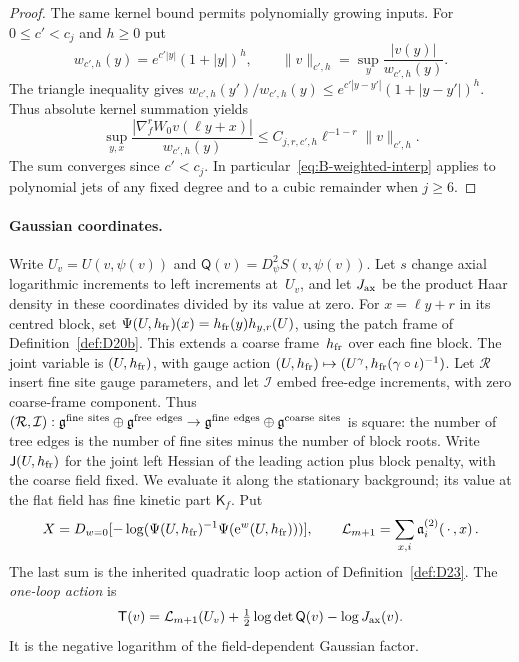 \begin{proof}
The same kernel bound permits polynomially growing inputs. For $0\le c'<c_j$ and $h\ge0$ put
\begin{equation*}
w_{c',h}(y)=e^{c'|y|}(1+|y|)^h,\qquad
\|v\|_{c',h}=\sup_y\frac{|v(y)|}{w_{c',h}(y)}.
\end{equation*}
The triangle inequality gives $w_{c',h}(y')/w_{c',h}(y)\le e^{c'|y-y'|}(1+|y-y'|)^h$. Thus absolute kernel summation yields
\begin{equation}\label{eq:B-weighted-interp}
\sup_{y,x}\frac{|\nabla_f^rW_0v(\ell y+x)|}{w_{c',h}(y)}
\le C_{j,r,c',h}\ell^{-1-r}\|v\|_{c',h}.
\end{equation}
The sum converges since $c'<c_j$. In particular~\eqref{eq:B-weighted-interp} applies to polynomial jets of any fixed degree and to a cubic remainder when $j\ge6$.
\end{proof}

\paragraph{Gaussian coordinates.}
Write $U_v=U(v,\psi(v))$ and $\mathsf Q(v)=D_\psi^2S(v,\psi(v))$. Let $s$ change axial logarithmic increments to left increments at~$U_v$, and let $J_{\rm ax}$ be the product Haar density in these coordinates divided by its value at zero. For $x=\ell y+r$ in its centred block, set $\Psi(U,h_{\rm fr})(x)=h_{\rm fr}(y)h_{y,r}(U)$, using the patch frame of Definition~\ref{def:D20b}. This extends a coarse frame~$h_{\rm fr}$ over each fine block. The joint variable is $(U,h_{\rm fr})$, with gauge action
$(U,h_{\rm fr})\mapsto(U^\gamma,h_{\rm fr}(\gamma\circ\iota)^{-1})$.
Let $\mathcal R$ insert fine site gauge parameters, and let $\mathcal I$ embed free-edge increments, with zero coarse-frame component. Thus
$(\mathcal R,\mathcal I):\g^{\rm fine\ sites}\oplus\g^{\rm free\ edges}\to\g^{\rm fine\ edges}\oplus\g^{\rm coarse\ sites}$ is square: the number of tree edges is the number of fine sites minus the number of block roots. Write $\mathsf J(U,h_{\rm fr})$ for the joint left Hessian of the leading action plus block penalty, with the coarse field fixed. We evaluate it along the stationary background; its value at the flat field has fine kinetic part $\mathsf K_f$. Put
\begin{equation*}
X=D_{w=0}[-\log(\Psi(U,h_{\rm fr})^{-1}\Psi(\mathrm e^w(U,h_{\rm fr})))],\qquad
\mathcal L_{m+1}=\sum_{x,i}\mathfrak a_i^{(2)}(\,\cdot\,,x)\,.
\end{equation*}
The last sum is the inherited quadratic loop action of Definition~\ref{def:D23}. The \emph{one-loop action} is
\begin{equation*}
\mathsf T(v)=\mathcal L_{m+1}(U_v)+\tfrac12\log\det\mathsf Q(v)-\log J_{\rm ax}(v).
\end{equation*}
It is the negative logarithm of the field-dependent Gaussian factor.

